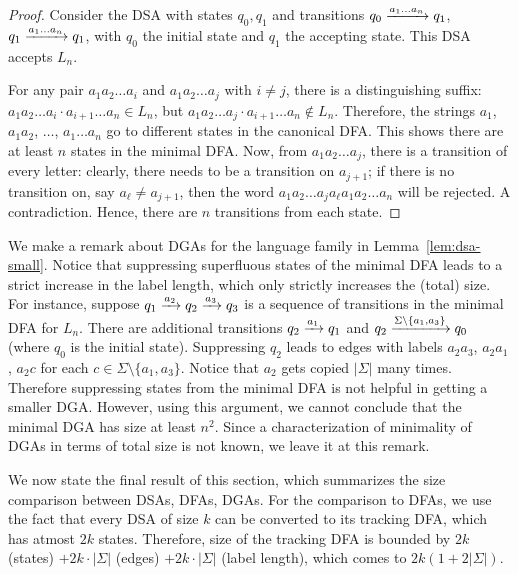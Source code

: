 \begin{proof}
  Consider the DSA with states $q_0, q_1$ and transitions
  $q_0 \xrightarrow{a_1 \dots a_n} q_1$, $q_1 \xrightarrow{a_1 \dots a_n} q_1$, with
  $q_0$ the initial state and $q_1$ the accepting state. This DSA
  accepts $L_n$.

  For any pair $a_1 a_2 \dots a_i$ and $a_1 a_2 \dots a_j$ with
  $i \neq j$, there is a distinguishing suffix:
  $a_1 a_2 \dots a_i \cdot a_{i+1} \dots a_n \in L_n$, but
  $a_1 a_2 \dots a_j \cdot  a_{i+1} \dots a_n \notin
  L_n$. Therefore, the strings $a_1$, $a_1a_2$, $\dots$,
  $a_1 \dots a_n$ go to different states in the canonical DFA. This
  shows there are at least $n$ states in the minimal DFA. Now, from
  $a_1 a_2 \dots a_j$, there is a transition of every letter: clearly,
  there needs to be a transition on $a_{j+1}$; if there is no
  transition on, say $a_\ell \neq a_{j+1}$, then the word
  $a_1 a_2 \dots a_j a_\ell a_1 a_2 \dots a_n$ will be rejected. A
  contradiction. Hence, there are $n$ transitions from each state.
\end{proof}

We make a remark about DGAs for the language family in
Lemma~\ref{lem:dsa-small}. Notice that suppressing superfluous states
of the minimal DFA leads to a strict increase in the label length,
which only strictly increases the (total) size. For instance, suppose
$q_1 \xrightarrow{a_2} q_2 \xrightarrow{a_3} q_3$ is a sequence of transitions in the
minimal DFA for $L_n$. There are additional transitions
$q_2 \xrightarrow{a_1} q_1$ and $q_2 \xrightarrow{\Sigma \setminus \{a_1, a_3\}} q_0$
(where $q_0$ is the initial state). Suppressing $q_2$ leads to edges
with labels $a_2a_3$, $a_2a_1$, $a_2 c$ for each
$c \in \Sigma \setminus \{a_1, a_3\}$. Notice that $a_2$ gets copied
$|\Sigma|$ many times. Therefore suppressing states from the minimal
DFA is not helpful in getting a smaller DGA. However, using this
argument, we cannot conclude that the minimal DGA has size at least
$n^2$. Since a characterization of minimality of DGAs in terms of
total size is not known, we leave it at this remark.


We now state the final result of this section, which summarizes the
size comparison between DSAs, DFAs, DGAs. For the comparison to DFAs,
we use the fact that every DSA of size $k$ can be converted to its
tracking DFA, which has atmost $2k$ states. Therefore, size of the
tracking DFA is
bounded by $2k$ (states) $ + 2k \cdot |\Sigma|$ (edges)
$ + 2k \cdot |\Sigma|$ (label length), which comes to
$2k ( 1+ 2|\Sigma|)$.

